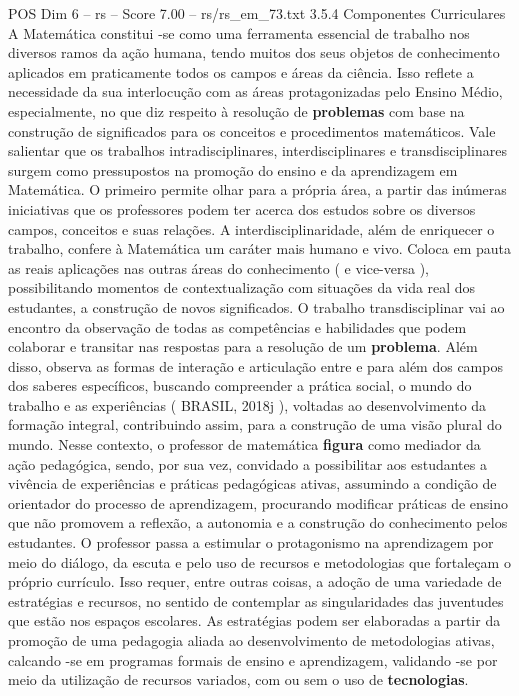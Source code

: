 \begin{textsample}{POS Dim 6 – rs – Score 7.00 – rs/rs\_em\_73.txt}  \label{ex:f6_pos_188}
3.5.4 Componentes Curriculares A Matemática constitui -se como uma ferramenta essencial de trabalho nos diversos ramos da ação humana, tendo muitos dos seus objetos de conhecimento aplicados em praticamente todos os campos e áreas da ciência.
Isso reflete a necessidade da sua interlocução com as áreas protagonizadas pelo Ensino Médio, especialmente, no que diz respeito à resolução de \textbf{problemas} com base na construção de significados para os conceitos e procedimentos matemáticos.
Vale salientar que os trabalhos intradisciplinares, interdisciplinares e transdisciplinares surgem como pressupostos na promoção do ensino e da aprendizagem em Matemática.
O primeiro permite olhar para a própria área, a partir das inúmeras iniciativas que os professores podem ter acerca dos estudos sobre os diversos campos, conceitos e suas relações.
A interdisciplinaridade, além de enriquecer o trabalho, confere à Matemática um caráter mais humano e vivo.
Coloca em pauta as reais aplicações nas outras áreas do conhecimento ( e vice-versa ), possibilitando momentos de contextualização com situações da vida real dos estudantes, a construção de novos significados.
O trabalho transdisciplinar vai ao encontro da observação de todas as competências e habilidades que podem colaborar e transitar nas respostas para a resolução de um \textbf{problema}.
Além disso, observa as formas de interação e articulação entre e para além dos campos dos saberes específicos, buscando compreender a prática social, o mundo do trabalho e as experiências ( BRASIL, 2018j ), voltadas ao desenvolvimento da formação integral, contribuindo assim, para a construção de uma visão plural do mundo.
Nesse contexto, o professor de matemática \textbf{figura} como mediador da ação pedagógica, sendo, por sua vez, convidado a possibilitar aos estudantes a vivência de experiências e práticas pedagógicas ativas, assumindo a condição de orientador do processo de aprendizagem, procurando modificar práticas de ensino que não promovem a reflexão, a autonomia e a construção do conhecimento pelos estudantes.
O professor passa a estimular o protagonismo na aprendizagem por meio do diálogo, da escuta e pelo uso de recursos e metodologias que fortaleçam o próprio currículo.
Isso requer, entre outras coisas, a adoção de uma variedade de estratégias e recursos, no sentido de contemplar as singularidades das juventudes que estão nos espaços escolares.
As estratégias podem ser elaboradas a partir da promoção de uma pedagogia aliada ao desenvolvimento de metodologias ativas, calcando -se em programas formais de ensino e aprendizagem, validando -se por meio da utilização de recursos variados, com ou sem o uso de \textbf{tecnologias}.

\end{textsample}
